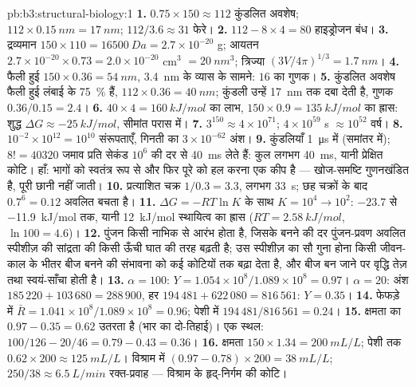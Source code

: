 \begin{solution}{pb:b3:structural-biology:1}
\textbf{1.} $0.75\times 150 \approx 112$ कुंडलित अवशेष; $112\times
\qty{0.15}{nm} = \qty{17}{nm}$; $112/3.6 \approx 31$ फेरे।
\textbf{2.} $112 - 8\times 4 = 80$ हाइड्रोजन बंध।
\textbf{3.} द्रव्यमान $150\times 110 = \qty{16500}{Da} = 2.7\times 10^{-20}$
g; आयतन $2.7\times 10^{-20}\times 0.73 = 2.0\times 10^{-20}$ cm$^{3}$
$= \qty{20}{nm^3}$; त्रिज्या $(3V/4\pi)^{1/3} = \qty{1.7}{nm}$।
\textbf{4.} फैली हुई $150\times 0.36 = \qty{54}{nm}$, \qty{3.4}{nm}
के व्यास के सामने: $16$ का गुणक।
\textbf{5.} कुंडलित अवशेष फैली हुई लंबाई के \qty{75}{\%} हैं,
$112\times 0.36 = \qty{40}{nm}$; कुंडली उन्हें
\qty{17}{nm} तक दबा देती है, गुणक $0.36/0.15 = 2.4$।
\textbf{6.} $40\times 4 = \qty{160}{kJ/mol}$ का लाभ, $150\times 0.9 =
\qty{135}{kJ/mol}$ का ह्रास: शुद्ध $\Delta G \approx \qty{-25}{kJ/mol}$,
सीमांत परास में।
\textbf{7.} $3^{150} \approx 4\times 10^{71}$; $4\times 10^{59}$ s
$\approx 10^{52}$ वर्ष।
\textbf{8.} $10^{-2}\times 10^{12} = 10^{10}$ संरूपताएँ, गिनती का
$3\times 10^{-62}$ अंश।
\textbf{9.} कुंडलियाँ \qty{1}{\micro s} में (समांतर में); $8! = \num{40320}$
जमाव प्रति सेकंड $10^{6}$ की दर से \qty{40}{ms} लेते हैं: कुल लगभग
\qty{40}{ms}, यानी प्रेक्षित कोटि। हाँ: भागों को स्वतंत्र रूप से और
फिर पूरे को हल करना एक कीप है --- खोज-समष्टि गुणनखंडित है, पूरी छानी
नहीं जाती।
\textbf{10.} प्रत्याशित चक्र $1/0.3 = 3.3$, लगभग \qty{33}{s}; छह
चक्रों के बाद $0.7^{6} = 0.12$ अवलित बचता है।
\textbf{11.} $\Delta G = -RT\ln K$ के साथ $K = 10^{4} \to 10^{2}$:
$-23.7$ से \qty{-11.9}{kJ/mol} तक, यानी \qty{12}{kJ/mol} स्थायित्व का
ह्रास ($RT = \qty{2.58}{kJ/mol}$, $\ln 100 = 4.6$)।
\textbf{12.} पुंजन किसी नाभिक से आरंभ होता है, जिसके बनने की दर
पुंजन-प्रवण अवलित स्पीशीज़ की सांद्रता की किसी ऊँची घात की तरह बढ़ती
है; उस स्पीशीज़ का सौ गुना होना किसी जीवन-काल के भीतर बीज बनने की
संभावना को कई कोटियों तक बढ़ा देता है, और बीज बन जाने पर वृद्धि तेज़
तथा स्वयं-साँचा होती है।
\textbf{13.} $\alpha = 100$: $Y = 1.054\times 10^{8}/1.089\times 10^{8} =
0.97$। $\alpha = 20$: अंश $185\,220 + 103\,680 = 288\,900$,
हर $194\,481 + 622\,080 = 816\,561$: $Y = 0.35$।
\textbf{14.} फेफड़े में $\bar R = 1.041\times 10^{8}/1.089\times 10^{8} = 0.96$;
पेशी में $194\,481/816\,561 = 0.24$।
\textbf{15.} क्षमता का $0.97 - 0.35 = 0.62$ उतरता है (भार का
दो-तिहाई)। एक स्थल: $100/126 - 20/46 = 0.79 - 0.43 = 0.36$।
\textbf{16.} क्षमता $150\times 1.34 = \qty{200}{mL/L}$; पेशी तक
$0.62\times 200 \approx \qty{125}{mL/L}$। विश्राम में $(0.97 - 0.78)\times
200 = \qty{38}{mL/L}$; $250/38 \approx \qty{6.5}{L/min}$ रक्त-प्रवाह
--- विश्राम के हृद्-निर्गम की कोटि।

\end{solution}
